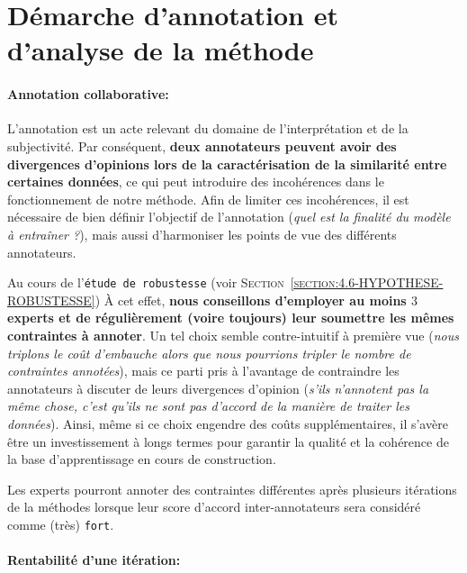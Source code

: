 	\section{Démarche d'annotation et d'analyse de la méthode}
	\label{section:5.3-GUIDE-UTILISER}
	
		\paragraph{\textcolor{colorSilverLakeBlue}{\faCheckSquare} Annotation collaborative:}
			
			L'annotation est un acte relevant du domaine de l'interprétation et de la subjectivité.
			Par conséquent, \textbf{deux annotateurs peuvent avoir des divergences d'opinions lors de la caractérisation de la similarité entre certaines données}, ce qui peut introduire des incohérences dans le fonctionnement de notre méthode.
			Afin de limiter ces incohérences, il est nécessaire de bien définir l'objectif de l'annotation (\textit{quel est la finalité du modèle à entraîner ?}), mais aussi d'harmoniser les points de vue des différents annotateurs.
			
			Au cours de l'\texttt{étude de robustesse} (voir \textsc{Section~\ref{section:4.6-HYPOTHESE-ROBUSTESSE}}) À cet effet, \textbf{nous conseillons d'employer au moins $3$ experts et de régulièrement (voire toujours) leur soumettre les mêmes contraintes à annoter}.
			Un tel choix semble contre-intuitif à première vue (\textit{nous triplons le coût d'embauche alors que nous pourrions tripler le nombre de contraintes annotées}), mais ce parti pris à l'avantage de contraindre les annotateurs à discuter de leurs divergences d'opinion (\textit{s'ils n'annotent pas la même chose, c'est qu'ils ne sont pas d'accord de la manière de traiter les données}).
			Ainsi, même si ce choix engendre des coûts supplémentaires, il s'avère être un investissement à longs termes pour garantir la qualité et la cohérence de la base d'apprentissage en cours de construction.
			
			Les experts pourront annoter des contraintes différentes après plusieurs itérations de la méthodes lorsque leur score d'accord inter-annotateurs sera considéré comme (très) \texttt{fort}.
		
		
		\paragraph{\textcolor{colorSilverLakeBlue}{\faCheckSquare} Rentabilité d'une itération:}
			
